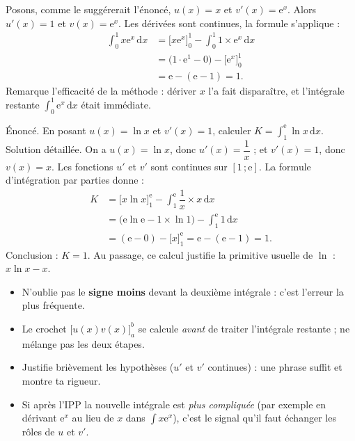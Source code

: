 \documentclass[11pt]{article}
\begin{document}
\begin{exemplebox}[Le calcul de référence : $\displaystyle\int_0^1 x\mathrm{e}^x\,\mathrm{d}x = 1$]
Posons, comme le suggérerait l'énoncé, $u(x) = x$ et $v'(x) = \mathrm{e}^x$. Alors $u'(x) = 1$ et $v(x) = \mathrm{e}^x$. Les dérivées sont continues, la formule s'applique :
\begin{align*}
\int_0^1 x\mathrm{e}^x\,\mathrm{d}x &= \big[x\mathrm{e}^x\big]_0^1 - \int_0^1 1 \times \mathrm{e}^x\,\mathrm{d}x \\
&= \big(1\cdot\mathrm{e}^1 - 0\big) - \big[\mathrm{e}^x\big]_0^1 \\
&= \mathrm{e} - (\mathrm{e} - 1) = 1.
\end{align*}
Remarque l'efficacité de la méthode : dériver $x$ l'a fait disparaître, et l'intégrale restante $\displaystyle\int_0^1 \mathrm{e}^x\,\mathrm{d}x$ était immédiate.
\end{exemplebox}

\begin{exoresolu}
Énoncé. En posant $u(x) = \ln x$ et $v'(x) = 1$, calculer $K = \displaystyle\int_1^{\mathrm{e}} \ln x\,\mathrm{d}x$.
\tcblower
Solution détaillée. On a $u(x) = \ln x$, donc $u'(x) = \dfrac{1}{x}$ ; et $v'(x) = 1$, donc $v(x) = x$. Les fonctions $u'$ et $v'$ sont continues sur $[1\,;\mathrm{e}]$. La formule d'intégration par parties donne :
\begin{align*}
K &= \big[x\ln x\big]_1^{\mathrm{e}} - \int_1^{\mathrm{e}} \dfrac{1}{x}\times x\,\mathrm{d}x \\
&= \big(\mathrm{e}\ln\mathrm{e} - 1\times\ln 1\big) - \int_1^{\mathrm{e}} 1\,\mathrm{d}x \\
&= (\mathrm{e} - 0) - \big[x\big]_1^{\mathrm{e}} = \mathrm{e} - (\mathrm{e} - 1) = 1.
\end{align*}
Conclusion : $K = 1$. Au passage, ce calcul justifie la primitive usuelle de $\ln$ : $x\ln x - x$.
\end{exoresolu}

\begin{attention}
\begin{itemize}
\item N'oublie pas le \textbf{signe moins} devant la deuxième intégrale : c'est l'erreur la plus fréquente.
\item Le crochet $\big[u(x)v(x)\big]_a^b$ se calcule \emph{avant} de traiter l'intégrale restante ; ne mélange pas les deux étapes.
\item Justifie brièvement les hypothèses ($u'$ et $v'$ continues) : une phrase suffit et montre ta rigueur.
\item Si après l'IPP la nouvelle intégrale est \emph{plus compliquée} (par exemple en dérivant $\mathrm{e}^x$ au lieu de $x$ dans $\int x\mathrm{e}^x$), c'est le signal qu'il faut échanger les rôles de $u$ et $v'$.
\end{itemize}
\end{attention}
\end{document}
